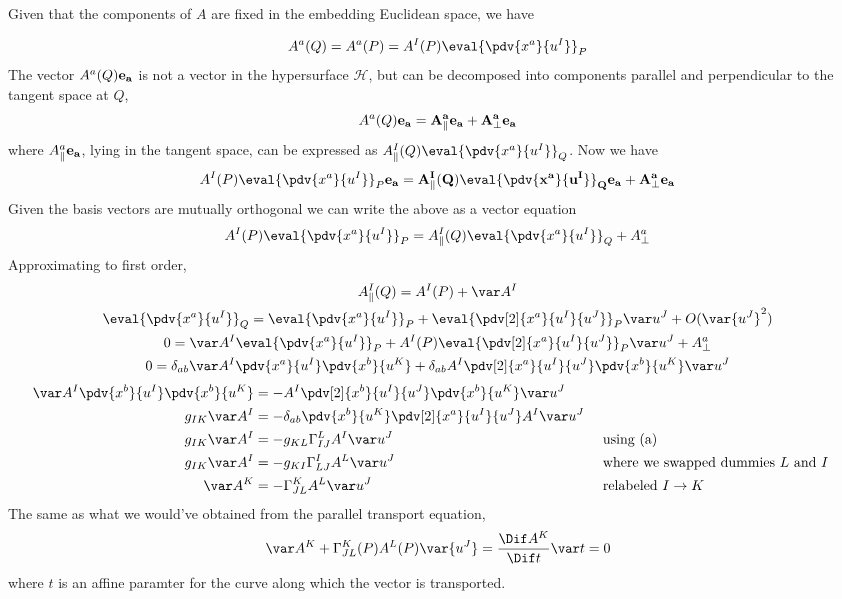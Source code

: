 \documentclass[12pt]{article}
\begin{document}
    \subsubsection{} Given that the components of \(A\) are fixed in the embedding Euclidean space, we have
    \begin{center}
        \def\svgwidth{200pt}
    \end{center}
    \begin{equation*}
        {A^a}(Q) = A^a(P) =  A^I(P) \eval{\pdv{x^a}{u^I}}_P
    \end{equation*}
    The vector \(A^a(Q) \bf e_a\) is not a vector in the hypersurface \(\mathcal{H}\), but can be decomposed into components parallel and perpendicular to the tangent space at \(Q\),
    \[
        A^a(Q) \bf e_a = A_\parallel^a \bf e_a + \bf A^a_\perp e_a
    \]
    where \( A_\parallel^a \bf e_a\), lying in the tangent space, can be expressed as \(A_\parallel^I(Q)\eval{\pdv{x^a}{u^I}}_Q\). Now we have
    \begin{equation*}
        A^I(P) \eval{\pdv{x^a}{u^I}}_P \bf e_a = A_\parallel^I(Q)\eval{\pdv{x^a}{u^I}}_Q \bf e_a + A^a_\perp \bf e_a
    \end{equation*}
    Given the basis vectors are mutually orthogonal we can write the above as a vector equation
    \begin{equation*}
        A^I(P) \eval{\pdv{x^a}{u^I}}_P  = A_\parallel^I(Q)\eval{\pdv{x^a}{u^I}}_Q  + A^a_\perp 
    \end{equation*}
    Approximating to first order,
    \begin{gather*}
        A_\parallel^I(Q) = A^I(P) + \var A^I\\
        \eval{\pdv{x^a}{u^I}}_Q = \eval{\pdv{x^a}{u^I}}_P + \eval{\pdv[2]{x^a}{u^I}{u^J}}_P \var u^J + O(\var{u^J}^2)\\
        0=  \var A^I\eval{\pdv{x^a}{u^I}}_P + A^I(P)\eval{\pdv[2]{x^a}{u^I}{u^J}}_P \var u^J + A^a_\perp\\
        0=  \delta_{ab}\var A^I {\pdv{x^a}{u^I}} \pdv{x^b}{u^K}+ \delta_{ab}A^I{\pdv[2]{x^a}{u^I}{u^J}} \pdv{x^b}{u^K} \var u^J 
    \end{gather*} \begin{align*}
        \var A^I {\pdv{x^b}{u^I}} \pdv{x^b}{u^K} &=  - A^I{\pdv[2]{x^b}{u^I}{u^J}} \pdv{x^b}{u^K} \var u^J \\
        g_{IK} \var A^I &=  - \delta_{ab} \pdv{x^b}{u^K} \pdv[2]{x^a}{u^I}{u^J}A^I \var u^J\\
        g_{IK} \var A^I &=  - g_{KL}\Gamma^{L}_{IJ}A^I \var u^J&&\text{ using (a)}\\
        g_{IK} \var A^I &=  - g_{KI}\Gamma^{I}_{LJ}A^L \var u^J&&\text{ where we swapped dummies \(L\) and \(I\)}\\
        \var A^K &=  - \Gamma^{K}_{JL}A^L \var u^J&&\text{ relabeled \(I\to K\)}
    \end{align*}
    The same as what we would've obtained from the parallel transport equation,
    \[
        \var A^K +\Gamma^{K}_{JL}(P)A^L(P) \var{u^J} = \frac{\Dif A^K}{\Dif t} \var t = 0
    \]
    where \(t\) is an affine paramter for the curve along which the vector is transported.
\end{document}
